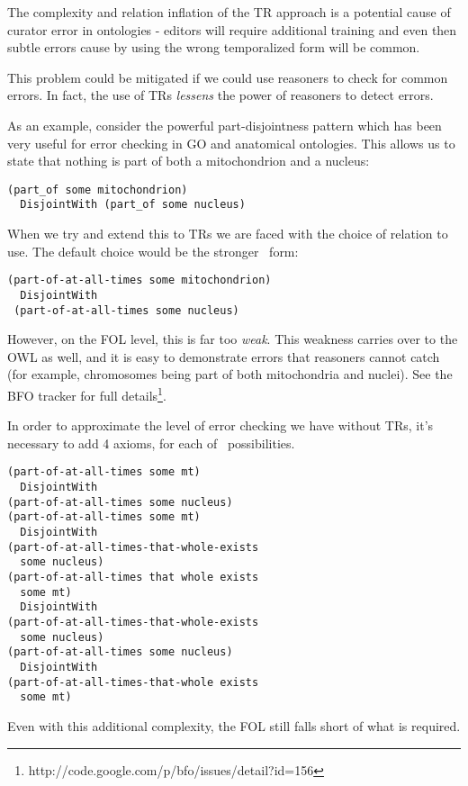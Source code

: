 \documentclass{bioinfo}
\def\atAllTimes{\pr{at-all-times}}
\begin{document}
The complexity and relation inflation of the TR approach is a
potential cause of curator error in ontologies - editors will require
additional training and even then subtle errors cause by using the
wrong temporalized form will be common.

This problem could be mitigated if we could use reasoners to check for
common errors. In fact, the use of TRs \emph{lessens} the power of
reasoners to detect errors.

As an example, consider the powerful part-disjointness
pattern\cite{PD} which has been very useful for error checking in GO
and anatomical ontologies. This allows us to state that nothing is
part of both a mitochondrion and a nucleus:

\begin{verbatim}
(part_of some mitochondrion) 
  DisjointWith (part_of some nucleus)
\end{verbatim}

When we try and extend this to TRs we are faced with the choice of
relation to use. The default choice would be the stronger \atAllTimes\
form:

\begin{verbatim}
(part-of-at-all-times some mitochondrion) 
  DisjointWith
 (part-of-at-all-times some nucleus)
\end{verbatim}

However, on the FOL level, this is far too \emph{weak}. This weakness
carries over to the OWL as well, and it is easy to demonstrate errors
that reasoners cannot catch (for example, chromosomes being part of
both mitochondria and nuclei). See the BFO tracker for
full details\footnote{http://code.google.com/p/bfo/issues/detail?id=156}.

In order to approximate the level of error checking we have without
TRs, it's necessary to add 4 axioms, for each of \atAllTimes\
possibilities.

\begin{verbatim}
(part-of-at-all-times some mt)
  DisjointWith
(part-of-at-all-times some nucleus)
(part-of-at-all-times some mt)
  DisjointWith
(part-of-at-all-times-that-whole-exists
  some nucleus)
(part-of-at-all-times that whole exists
  some mt)
  DisjointWith 
(part-of-at-all-times-that-whole-exists
  some nucleus)
(part-of-at-all-times some nucleus)
  DisjointWith
(part-of-at-all-times-that-whole exists
  some mt)
\end{verbatim}

Even with this additional complexity, the FOL still falls short of
what is required.
\end{document}
